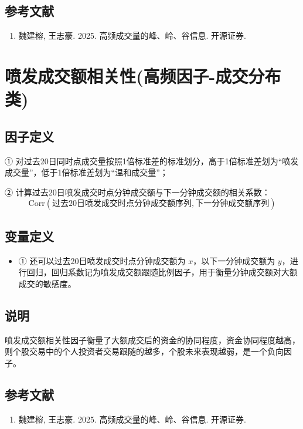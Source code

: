 \documentclass{article}
\begin{document}
\subsection{参考文献}
\begin{enumerate}
    \item 魏建榕, 王志豪. 2025. 高频成交量的峰、岭、谷信息. 开源证券.
\end{enumerate}

\section{喷发成交额相关性(高频因子-成交分布类)}

\subsection{因子定义}

① 对过去20日同时点成交量按照1倍标准差的标准划分，高于1倍标准差划为“喷发成交量”，低于1倍标准差划为“温和成交量”；

② 计算过去20日喷发成交时点分钟成交额与下一分钟成交额的相关系数：
\begin{equation}
    \mathrm{Corr}(\text{过去20日喷发成交时点分钟成交额序列}, \text{下一分钟成交额序列})
\end{equation}

\subsection{变量定义}
\begin{itemize}
    \item ① 还可以过去20日喷发成交时点分钟成交额为 \( x \)，以下一分钟成交额为 \( y \)，进行回归，回归系数记为喷发成交额跟随比例因子，用于衡量分钟成交额对大额成交的敏感度。
\end{itemize}

\subsection{说明}
喷发成交额相关性因子衡量了大额成交后的资金的协同程度，资金协同程度越高，则个股交易中的个人投资者交易跟随的越多，个股未来表现越弱，是一个负向因子。

\subsection{参考文献}
\begin{enumerate}
    \item 魏建榕, 王志豪. 2025. 高频成交量的峰、岭、谷信息. 开源证券.
\end{enumerate}
\end{document}
